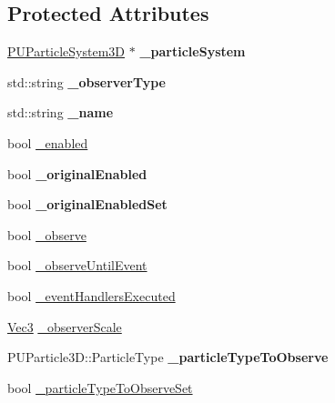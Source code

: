 \subsection*{Protected Attributes}
\begin{DoxyCompactItemize}
\item 
\mbox{\label{classPUObserver_ac8621c6d4105798562dbf4d234ce8f37}} 
\hyperlink{classPUParticleSystem3D}{P\+U\+Particle\+System3D} $\ast$ {\bfseries \+\_\+particle\+System}
\item 
\mbox{\label{classPUObserver_a2e8e4be52a1893b91d93a8e6e1da2dab}} 
std\+::string {\bfseries \+\_\+observer\+Type}
\item 
\mbox{\label{classPUObserver_a367c24c80159311fd59c8938616a1c48}} 
std\+::string {\bfseries \+\_\+name}
\item 
bool \hyperlink{classPUObserver_abd2d0d30d38ff290c7a552f8c45e75df}{\+\_\+enabled}
\item 
\mbox{\label{classPUObserver_a8fe80466aa80fcbd4f6ddebf4966ac28}} 
bool {\bfseries \+\_\+original\+Enabled}
\item 
\mbox{\label{classPUObserver_ae95ffee8d98889407ea3fab3a9dc4a75}} 
bool {\bfseries \+\_\+original\+Enabled\+Set}
\item 
bool \hyperlink{classPUObserver_a312f941c888fc472b0537b0d5238d042}{\+\_\+observe}
\item 
bool \hyperlink{classPUObserver_ac52443fc22487cd03368972848813e52}{\+\_\+observe\+Until\+Event}
\item 
bool \hyperlink{classPUObserver_a2e2bdbb02ceea9ed72679cdc13662579}{\+\_\+event\+Handlers\+Executed}
\item 
\hyperlink{classVec3}{Vec3} \hyperlink{classPUObserver_ad96714e5e2acc265fffcdfcaf8cdac58}{\+\_\+observer\+Scale}
\item 
\mbox{\label{classPUObserver_a30eece46bb9a3770e2b54661ad5923e9}} 
P\+U\+Particle3\+D\+::\+Particle\+Type {\bfseries \+\_\+particle\+Type\+To\+Observe}
\item 
bool \hyperlink{classPUObserver_ac350905c69ad227b05ae5c981d6e725a}{\+\_\+particle\+Type\+To\+Observe\+Set}
\item 
\mbox{\label{classPUObserver_ab5b9891d7abeb04ca19d24795222b706}} 

\end{DoxyCompactItemize}
